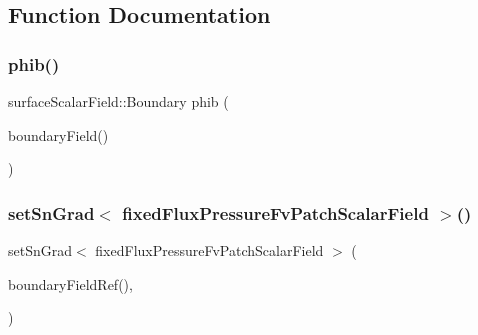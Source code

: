 \subsection{Function Documentation}
\mbox{\label{setSnGradP__rgh__2p_8H_a4d56728e94632e78708c6f057a4d4fdc}} 
\subsubsection{\texorpdfstring{phib()}{phib()}}
{\footnotesize\ttfamily surface\+Scalar\+Field\+::\+Boundary phib (\begin{DoxyParamCaption}\item[{phi\+\_\+.}]{boundary\+Field() }\end{DoxyParamCaption})}

\mbox{\label{setSnGradP__rgh__2p_8H_a8d02278364167d6d377e0f86917aa058}} 
\subsubsection{\texorpdfstring{set\+Sn\+Grad$<$ fixed\+Flux\+Pressure\+Fv\+Patch\+Scalar\+Field $>$()}{setSnGrad< fixedFluxPressureFvPatchScalarField >()}}
{\footnotesize\ttfamily set\+Sn\+Grad$<$ fixed\+Flux\+Pressure\+Fv\+Patch\+Scalar\+Field $>$ (\begin{DoxyParamCaption}\item[{p\+\_\+rgh\+\_\+.}]{boundary\+Field\+Ref(),  }\item[{(phi\+Hby\+A.\+boundary\+Field() -\/ \hyperlink{setSnGradP__rgh__2p_8H_a4d56728e94632e78708c6f057a4d4fdc}{phib})/(mesh\+\_\+.\+mag\+Sf().boundary\+Field() $\ast$r\+A\+Uf.\+boundary\+Field())}]{ }\end{DoxyParamCaption})}



